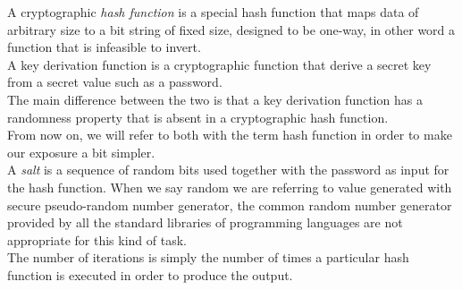 A cryptographic \emph{hash function} is a special hash function that maps data of arbitrary size to a bit string of fixed size, designed to be one-way, in other word a function that is infeasible to invert.\\
A key derivation function is a cryptographic function that derive a secret key from a secret value such as a password.\\
The main difference between the two is that a key derivation function has a randomness property that is absent in a cryptographic hash function.\\
From now on, we will refer to both with the term hash function in order to make our exposure a bit simpler.\\
A \emph{salt} is a sequence of random bits used together with the password as input for the hash function. When we say random we are referring to value generated with secure pseudo-random number generator, the common random number generator provided by all the standard libraries of programming languages are not appropriate for this kind of task.\\
The number of iterations is simply the number of times a particular hash function is executed in order to produce the output.\\

